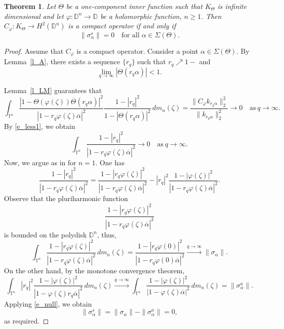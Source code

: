 \documentclass[10pt,a4paper]{amsart}
\newtheorem{theorem}{Theorem}
\newcommand{\Dbb}{\mathbb D}
\newcommand{\al}{\alpha}
\newcommand{\clk}{\sigma}
\newcommand{\cph}{C_\varphi}
\newcommand{\diin}{\Theta}
\newcommand{\dn}{\mathbb{D}^n}
\newcommand{\knl}{k}
\newcommand{\meal}{m_n}
\newcommand{\ph}{\varphi}
\newcommand{\spr}{\Sigma}
\newcommand{\tn}{\mathbb{T}^n}
\newcommand{\za}{\zeta}
\begin{document}
\begin{theorem}\label{T_2}
Let $\diin$ be a one-component inner function such that $K_\diin$ is infinite dimensional
and let $\ph: \dn\to \Dbb$ be a holomorphic function, $n\ge 1$.
Then $\cph: K_\diin \to H^2(\dn)$ is a compact operator if and only if
\begin{equation}\label{e_clark}
\|\clk_\al^s\| =0 \quad \textrm{for all $\al\in\spr(\diin)$}.
\end{equation}
\end{theorem}

\begin{proof}
Assume that $\cph$ is a compact operator.
Consider a point $\al\in\spr(\diin)$.
By Lemma~\ref{l_A}, there exists a sequence $\{r_q\}$ such that $r_q\nearrow 1-$ and
\begin{equation}\label{e_less1}
  \lim_{q\to \infty} |\diin(r_q\al)| <1.
\end{equation}

Lemma~\ref{l_LM} guarantees that
\[
\int_{\tn}\frac{|1-\diin(\ph(\za))\overline{\diin}(r_q\al)|^2}{|1- r_q\ph(\za)\overline{\al}|^2} \frac{1-|r_q|^2}{1-|\diin(r_q\al)|^2}\,d\meal(\za)
= \frac{\|\cph \knl_{r_q\al}\|^2_{2}}{\|\knl_{r_q\al}\|^2_2} \to 0\quad \textrm{as}\ q\to\infty.
\]
By \eqref{e_less1}, we obtain
\begin{equation}\label{e_null}
  \int_{\tn}\frac{1-|r_q|^2}{|1- r_q\ph(\za)\overline{\al}|^2}
\to 0\quad \textrm{as}\ q\to\infty.
\end{equation}
Now, we argue as in \cite{CM97} for $n=1$.
One has
\[
\frac{1-|r_q|^2}{|1- r_q\ph(\za)\overline{\al}|^2}
= \frac{1-|r_q \ph(\za)|^2}{|1- r_q\ph(\za)\overline{\al}|^2}
-  |r_q|^2 \frac{1-|\ph(\za)|^2}{|1- r_q\ph(\za)\overline{\al}|^2}.
\]
Observe that the pluriharmonic function
\[
\frac{1-|r_q \ph(\za)|^2}{|1- r_q\ph(\za)\overline{\al}|^2}
\]
is bounded on the polydisk $\dn$,
thus,
\[
\int_{\tn}\frac{1-|r_q \ph(\za)|^2}{|1- r_q\ph(\za)\overline{\al}|^2}\, d\meal(\za) =
\frac{1-|r_q \ph(0)|^2}{|1- r_q\ph(0)\overline{\al}|^2}\overset{q\to \infty}\longrightarrow  \|\clk_\al\|.
\]
On the other hand, by the monotone convergence theorem,
\[
\int_{\tn}|r_q|^2 \frac{1-|\ph(\za)|^2}{|1- \ph(\za) r_q\overline{\al}|^2}\, d\meal(\za) \overset{q\to \infty}\longrightarrow
\int_{\tn}\frac{1-|\ph(\za)|^2}{|1- \ph(\za)\overline{\al}|^2}\, d\meal(\za) = \|\clk_\al^a\|.
\]
Applying \eqref{e_null}, we obtain
\[
\|\clk_\al^s\| = \|\clk_\al\| - \|\clk_\al^a\| =0,
\]
as required.


\end{proof}
\end{document}
